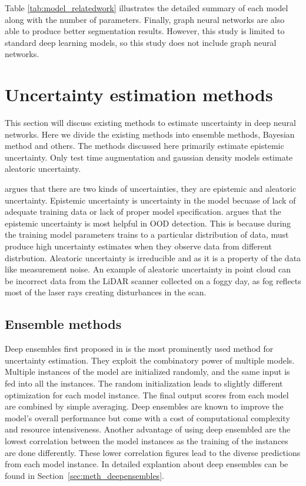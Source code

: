 Table \ref{tab:model_relatedwork} illustrates the detailed summary of each model along with the number of parameters.
Finally, graph neural networks \cite{dyn_graph_cnn} are also able to produce better segmentation results. However, this study is limited to standard deep learning models, so this study does not include graph neural networks.

    \section{Uncertainty estimation methods}
    This section will discuss existing methods to estimate uncertainty in deep neural networks.
    Here we divide the existing methods into ensemble methods, Bayesian method and others.
    The methods discussed here primarily estimate epistemic uncertainty. Only test time augmentation and gaussian density models estimate aleatoric uncertainty.

    \cite{matias_uncertainty} argues that there are two kinds of uncertainties, they are epistemic and aleatoric uncertainty.
    Epistemic uncertainty is uncertainty in the model becuase of lack of adequate training data or lack of proper model specification.
    \cite{matias_uncertainty} argues that the epistemic uncertainty is most helpful in OOD detection.
    This is because during the training model parameters trains to a particular distribution of data, must produce high uncertainty estimates when they observe data from different distrbution.
    Aleatoric uncertainty is irreducible and as it is a property of the data like measurement noise.
    An example of aleatoric uncertainty in point cloud can be incorrect data from the LiDAR scanner collected on a foggy day, as fog reflects most of the laser rays creating disturbances in the scan.
    \subsection{Ensemble methods}
    Deep ensembles first proposed in  \cite{lakshminarayanan2016simple} is the most prominently used method for uncertainty estimation.
    They exploit the combinatory power of multiple models.
    Multiple instances of the model are initialized randomly, and the same input is fed into all the instances.
    The random initialization leads to slightly different optimization for each model instance. The final output scores from each model are combined by simple averaging.
    Deep ensembles are known to improve the model's overall performance but come with a cost of computational complexity and resource intensiveness.
    Another advantage of using deep ensembled are the lowest correlation between the model instances as the training of the instances are done differently.
    These lower correlation figures lead to the diverse predictions from each model instance.
    In detailed explantion about deep ensembles can be found in Section~\ref{sec:meth_deepensembles}.


